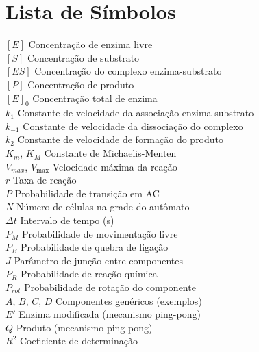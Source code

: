 \documentclass[12pt,oneside]{report}
\begin{document}
\chapter*{Lista de Símbolos}
\begin{tabbing}
    $[E]$ \hspace{2cm} \= Concentração de enzima livre \\
    $[S]$ \> Concentração de substrato \\
    $[ES]$ \> Concentração do complexo enzima-substrato \\
    $[P]$ \> Concentração de produto \\
    $[E]_0$ \> Concentração total de enzima \\
    $k_1$ \> Constante de velocidade da associação enzima-substrato \\
    $k_{-1}$ \> Constante de velocidade da dissociação do complexo \\
    $k_2$ \> Constante de velocidade de formação do produto \\
    $K_m$, $K_M$ \> Constante de Michaelis-Menten \\
    $V_{max}$, $V_{\max}$ \> Velocidade máxima da reação \\
    $r$ \> Taxa de reação \\
    $P$ \> Probabilidade de transição em AC \\
    $N$ \> Número de células na grade do autômato \\
    $\Delta t$ \> Intervalo de tempo (s) \\
    $P_M$ \> Probabilidade de movimentação livre \\
    $P_B$ \> Probabilidade de quebra de ligação \\
    $J$ \> Parâmetro de junção entre componentes \\
    $P_R$ \> Probabilidade de reação química \\
    $P_{rot}$ \> Probabilidade de rotação do componente \\
    $A$, $B$, $C$, $D$ \> Componentes genéricos (exemplos) \\
    $E'$ \> Enzima modificada (mecanismo ping-pong) \\
    $Q$ \> Produto (mecanismo ping-pong) \\
    $R^2$ \> Coeficiente de determinação \\
\end{tabbing}

\newpage
\end{document}

